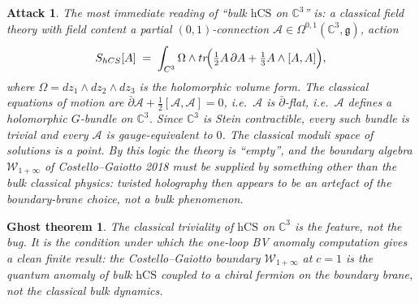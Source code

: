 \documentclass[11pt]{article}
\newtheorem*{ghost}{Ghost theorem}
\newtheorem*{attack}{Attack}
\providecommand{\C}{\mathbb{C}}
\providecommand{\cA}{\mathcal{A}}
\providecommand{\cW}{\mathcal{W}}
\providecommand{\fg}{\mathfrak{g}}
\providecommand{\hCS}{\mathrm{hCS}}
\providecommand{\dbar}{\bar\partial}
\begin{document}
\begin{attack}
The most immediate reading of ``bulk $\hCS$ on $\C^3$'' is: a classical
field theory with field content a partial $(0,1)$-connection
$\cA \in \Omega^{0,1}(\C^3, \fg)$, action
\[
  S_{\hCS}[\cA]
  \;=\; \int_{\C^3} \Omega \wedge \mathrm{tr}\!\Bigl(
      \tfrac{1}{2}\cA\,\dbar\cA
      + \tfrac{1}{3}\cA \wedge [\cA, \cA]\Bigr),
\]
where $\Omega = dz_1\wedge dz_2\wedge dz_3$ is the holomorphic volume
form. The classical equations of motion are
$\dbar\cA + \tfrac{1}{2}[\cA, \cA] = 0$, i.e.\ $\cA$ is $\dbar$-flat,
i.e.\ $\cA$ defines a holomorphic $G$-bundle on $\C^3$. Since $\C^3$
is Stein contractible, every such bundle is trivial and every $\cA$ is
gauge-equivalent to $0$. The classical moduli space of solutions is a
point. By this logic the theory is ``empty'', and the boundary algebra
$\cW_{1+\infty}$ of Costello--Gaiotto 2018 must be supplied by something
other than the bulk classical physics: twisted holography then appears
to be an artefact of the boundary-brane choice, not a bulk phenomenon.
\end{attack}

\begin{ghost}
\emph{The classical triviality of $\hCS$ on $\C^3$ is the feature, not
the bug. It is the condition under which the one-loop BV anomaly
computation gives a clean finite result: the Costello--Gaiotto boundary
$\cW_{1+\infty}$ at $c = 1$ is the quantum anomaly of bulk $\hCS$
coupled to a chiral fermion on the boundary brane, not the classical
bulk dynamics.}
\end{ghost}
\end{document}
